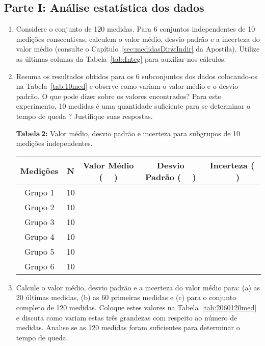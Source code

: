 \subsection*{Parte I: Análise estatística dos dados}

\begin{enumerate}
\item Considere o conjunto de 120 medidas. Para 6 conjuntos independentes de 10 medições consecutivas, calculem o valor médio, desvio padrão e a incerteza do valor médio (consulte o Capítulo~\ref{sec:medidasDir&Indir}  da Apostila). Utilize as últimas colunas da Tabela~\ref{tab:Integ} para auxiliar nos cálculos.

\item Resuma os resultados obtidos para os 6 subconjuntos dos dados colocando-os na Tabela~\ref{tab:10med} e observe como variam o valor médio e o desvio padrão. O que pode dizer sobre os valores encontrados? Para este experimento, 10 medidas é uma quantidade suficiente para se determinar o tempo de queda ? Justifique suas respostas. 

\renewcommand{\arraystretch}{1.5}
\begin{center}
{{\bf Tabela\,2:} Valor médio, desvio padrão e incerteza para subgrupos de 10 medições independentes.} 
  \begin{tabular}{|c|c|c|c|c|} \hline
  \bf Medições & \bf N & \bf Valor Médio ($\;\;\;\;\;$) & \bf Desvio Padrão ($\;\;\;\;\;$) & \bf Incerteza ($\;\;\;\;\;$) \\ \hline
  Grupo 1 & 10 & & & \\ \hline
  Grupo 2 & 10 & & & \\ \hline
  Grupo 3 & 10 & & & \\ \hline
  Grupo 4 & 10 & & & \\ \hline
  Grupo 5 & 10 & & & \\ \hline
  Grupo 6 & 10 & & & \\ \hline
  \end{tabular}
  \label{tab:10med}
\end{center}

\item Calcule o valor médio, desvio padrão e a incerteza do valor médio para: (a) as 20 últimas medidas, (b) as 60 primeiras medidas e (c) para o conjunto completo de 120 medidas. Coloque estes valores na Tabela~\ref{tab:2060120med} e discuta como  variam estas três grandezas com respeito ao número de medidas. Analise se as 120 medidas foram suficientes para determinar o tempo de queda. 


\end{enumerate}
